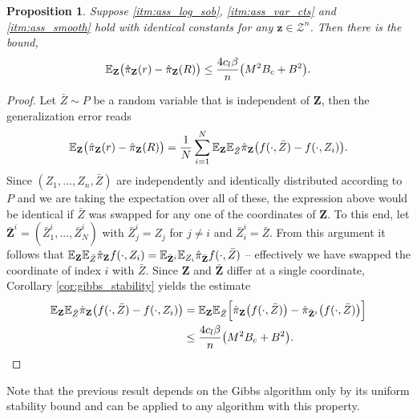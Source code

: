 \documentclass{article}
\newtheorem{proposition}[theorem]{Proposition}
\newcommand{\Bbf}[1]{\mathbf{#1}}
\newcommand{\Bcal}[1]{\mathcal{#1}}
\begin{document}
\begin{proposition}\label{prop:gibbs_gen_bound}
Suppose \ref{itm:ass_log_sob}, \ref{itm:ass_var_cts} and \ref{itm:ass_smooth} hold with identical constants for any \(\Bbf{z} \in \Bcal{Z}^n\). Then there is the bound,
\begin{equation*}
    \Bbb{E}_{\Bbf{Z}}\big ( \hat{\pi}_{\Bbf{Z}}(r) - \hat{\pi}_{\Bbf{Z}}(R) \big ) \leq \frac{4 c_l \beta}{n} \big ( M^2 B_c + B^2 \big ).
\end{equation*}
\end{proposition}
\begin{proof}
Let \(\bar{Z} \sim P\) be a random variable that is independent of \(\Bbf{Z}\), then the generalization error reads
\begin{equation*}
    \Bbb{E}_{\Bbf{Z}}\big ( \hat{\pi}_{\Bbf{Z}}(r) - \hat{\pi}_{\Bbf{Z}}(R) \big ) = \frac{1}{N} \sum_{i=1}^N \Bbb{E}_{\Bbf{Z}} \Bbb{E}_{\bar{Z}} \hat{\pi}_{\Bbf{Z}} \big ( f(\cdot, \bar{Z}) - f(\cdot, Z_i) \big ).
\end{equation*}
Since \((Z_1, ..., Z_n, \bar{Z})\) are independently and identically distributed according to \(P\) and we are taking the expectation over all of these, the expression above would be identical if \(\bar{Z}\) was swapped for any one of the coordinates of \(\Bbf{Z}\). To this end, let \(\bar{\Bbf{Z}}^i = (\bar{Z}^i_1, ..., \bar{Z}^i_N)\) with \(\bar{Z}^i_j = Z_j\) for \(j \neq i\) and \(\bar{Z}^i_i = \bar{Z}\). From this argument it follows that \(\Bbb{E}_{\Bbf{Z}} \Bbb{E}_{\bar{Z}} \hat{\pi}_{\Bbf{Z}} f(\cdot, Z_i) = \Bbb{E}_{\bar{\Bbf{Z}}^i} \Bbb{E}_{Z_i} \hat{\pi}_{\bar{\Bbf{Z}}} f(\cdot, \bar{Z})\) -- effectively we have swapped the coordinate of index \(i\) with \(\bar{Z}\). Since \(\Bbf{Z}\) and \(\bar{\Bbf{Z}}\) differ at a single coordinate, Corollary \ref{cor:gibbs_stability} yields the estimate
\begin{align*}
    \Bbb{E}_{\Bbf{Z}} \Bbb{E}_{\bar{Z}} \hat{\pi}_{\Bbf{Z}} \big ( f(\cdot, \bar{Z}) - f(\cdot, Z_i) \big ) &= \Bbb{E}_{\Bbf{Z}} \Bbb{E}_{\bar{Z}} \Big [ \hat{\pi}_{\Bbf{Z}} \big ( f(\cdot, \bar{Z}) \big ) - \hat{\pi}_{\bar{\Bbf{Z}}^i} \big ( f(\cdot, \bar{Z}) \big ) \Big ]\\
    &\leq \frac{4 c_l \beta}{n} \big ( M^2 B_c + B^2 \big ).
\end{align*}
\end{proof}

Note that the previous result depends on the Gibbs algorithm only by its uniform stability bound and can be applied to any algorithm with this property.
\end{document}
